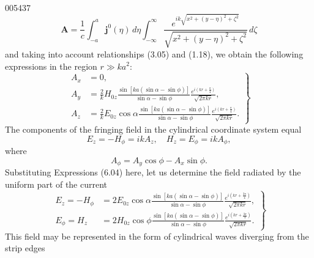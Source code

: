 \begin{scanpage}{0054}{37}
\[\mathbf A=\frac1c\int_{-a}^a\mathbf j^0(\eta)\,d\eta\int_{-\infty}^{\infty}\frac{e^{ik\sqrt{x^2+(y-\eta)^2+\zeta^2}}}{\sqrt{x^2+(y-\eta)^2+\zeta^2}}\,d\zeta\tag{6.03}\]
and taking into account relationships (3.05) and (1.18), we obtain the following expressions in the region $r\gg ka^2$:
\[\left.\begin{aligned}A_x&=0,\\A_y&=\frac2kH_{0z}\frac{\sin[ka(\sin\alpha-\sin\phi)]}{\sin\alpha-\sin\phi}\frac{e^{i(kr+\frac\pi4)}}{\sqrt{2\pi kr}},\\A_z&=\frac2kE_{0z}\cos\alpha\frac{\sin[ka(\sin\alpha-\sin\phi)]}{\sin\alpha-\sin\phi}\frac{e^{i(kr+\frac\pi4)}}{\sqrt{2\pi kr}}.\end{aligned}\right\}\tag{6.04}\]
The components of the fringing field in the cylindrical coordinate system equal
\[E_z=-H_\phi=ikA_z,\quad H_z=E_\phi=ikA_\phi,\tag{6.05}\]
where
\[A_\phi=A_y\cos\phi-A_x\sin\phi.\tag{6.06}\]
Substituting Expressions (6.04) here, let us determine the field radiated by the uniform part of the current
\[\left.\begin{aligned}E_z=-H_\phi&=2E_{0z}\cos\alpha\frac{\sin[ka(\sin\alpha-\sin\phi)]}{\sin\alpha-\sin\phi}\frac{e^{i(kr+\frac{3\pi}4)}}{\sqrt{2\pi kr}},\\E_\phi=H_z&=2H_{0z}\cos\phi\frac{\sin[ka(\sin\alpha-\sin\phi)]}{\sin\alpha-\sin\phi}\frac{e^{i(kr+\frac{3\pi}4)}}{\sqrt{2\pi kr}}.\end{aligned}\right\}\tag{6.07}\]
This field may be represented in the form of cylindrical waves diverging from the strip edges
\end{scanpage}
